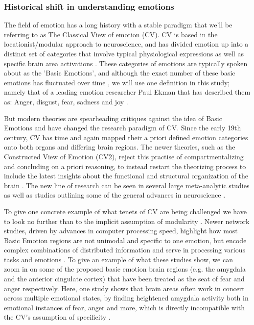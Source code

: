 \documentclass{article}
\begin{document}
\subsubsection{Historical shift in understanding emotions}
The field of emotion has a long history with a stable paradigm that we’ll be referring to as The Classical View of emotion (CV).
CV is based in the locationist/modular approach to neuroscience, and has divided emotion up into a distinct set of categories that involve typical physiological expressions as well as specific brain area activations \cite{ekman1976pictures,fodor1983modularity}. These categories of emotions are typically spoken about as the ’Basic Emotions’, and although the exact number of these basic emotions has fluctuated over time \cite{liao20192imimbci}, we will use one definition in this study; namely that of a leading emotion researcher Paul Ekman that has described them as: Anger, disgust, fear, sadness and joy \cite{dalgleish2000handbook}.
 
But modern theories are spearheading critiques against the idea of Basic Emotions and have changed the research paradigm of CV. Since the early 19th century, CV has time and again mapped their a priori defined emotion categories onto both organs and differing brain regions. 
The newer theories, such as the Constructed View of Emotion (CV2), reject this practise of compartmentalizing and concluding on a priori reasoning, to instead restart the theorizing process to include the latest insights about the functional and structural organization of the brain \cite{barrett2019historical}. The new line of research can be seen in several large meta-analytic studies \cite{kober2008functional,lindquist2012brain} as well as studies outlining some of the general advances in neuroscience \cite{smitha2017resting, touroutoglou2015intrinsic}. 
 
To give one concrete example of what tenets of CV are being challenged we have to look no further than to the implicit assumption of modularity \cite{fodor1983modularity}.
Newer network studies, driven by advances in computer processing speed, highlight how most Basic Emotion regions are not unimodal and specific to one emotion, but encode complex combinations of distributed information and serve in processing various tasks and emotions \cite{chang2017code,rigotti2013importance,somerville2006prior,wright2008emotion}.
To give an example of what these studies show, we can zoom in on some of the proposed basic emotion brain regions (e.g. the amygdala and the anterior cingulate cortex) that have been treated as the seat of fear and anger respectively. Here, one study shows that brain areas often work in concert across multiple emotional states, by finding heightened amygdala activity both in emotional instances of fear, anger and more, which is directly  incompatible with the CV’s assumption of specificity \cite{menon2015salience, touroutoglou2015intrinsic}.
 
\end{document}
